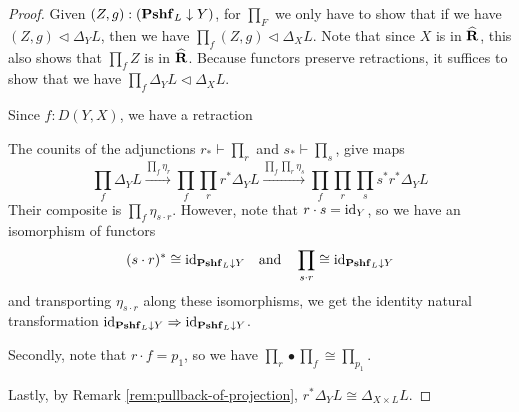 \begin{proof}
  Given $ (Z, g) : (\mathbf{Pshf}_{L} \downarrow Y) $, for $ \prod_F $ we only have to show that if we have $ (Z, g) \triangleleft \Delta_Y L $, then we have $ \prod_f(Z, g) \triangleleft \Delta_X L $. Note that since $ X $ is in $ \widehat {\mathbf{R}} $, this also shows that $ \prod_f Z $ is in $ \widehat {\mathbf{R}} $. Because functors preserve retractions, it suffices to show that we have $ \prod_f \Delta_Y L \triangleleft \Delta_X L $.

  Since $ f : D(Y, X) $, we have a retraction
  \begin{center}
  \end{center}

  The counits of the adjunctions $ r_* \vdash \prod_r $ and $ s_* \vdash \prod_s $, give maps
  \[
    \prod_f \Delta_Y L \xrightarrow{\prod_f \eta_r}
    \prod_f \prod_r r^* \Delta_Y L \xrightarrow{\prod_f \prod_r \eta_s}
    \prod_f \prod_r \prod_s s^* r^* \Delta_Y L
  \]
  Their composite is $ \prod_f \eta_{s \cdot r} $. However, note that $ r \cdot s = \text{id}_{Y} $, so we have an isomorphism of functors
  \[ (s \cdot r)^* \cong \text{id}_{\mathbf{Pshf}_{L} \downarrow Y} \quad \text{and} \quad \prod_{s \cdot r} \cong \text{id}_{\mathbf{Pshf}_{L} \downarrow Y} \]
  and transporting $ \eta_{s \cdot r} $ along these isomorphisms, we get the identity natural transformation $ \text{id}_{\mathbf{Pshf}_{L} \downarrow Y} \Rightarrow \text{id}_{\mathbf{Pshf}_{L} \downarrow Y} $.

  Secondly, note that $ r \cdot f = p_1 $, so we have $ \prod_r \bullet \prod_f \cong \prod_{p_1} $.

  Lastly, by Remark \ref{rem:pullback-of-projection}, $ r^* \Delta_Y L \cong \Delta_{X \times L} L $.


\end{proof}
